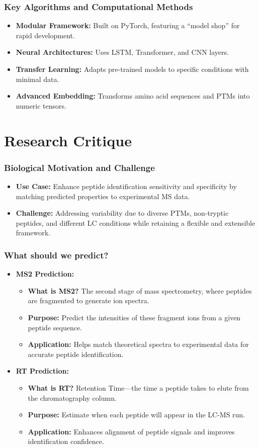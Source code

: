 \documentclass{beamer}
\begin{document}
\begin{frame}
  \frametitle{Key Algorithms and Computational Methods}
  \begin{itemize}
    \item \textbf{Modular Framework:} Built on PyTorch, featuring a “model shop” for rapid development.
    \item \textbf{Neural Architectures:} Uses LSTM, Transformer, and CNN layers.
    \item \textbf{Transfer Learning:} Adapts pre-trained models to specific conditions with minimal data.
    \item \textbf{Advanced Embedding:} Transforms amino acid sequences and PTMs into numeric tensors.
  \end{itemize}
\end{frame}

\section{Research Critique}
\begin{frame}
  \frametitle{Biological Motivation and Challenge}
  \begin{itemize}
    \item \textbf{Use Case:} Enhance peptide identification sensitivity and specificity by matching predicted properties to experimental MS data.
    \item \textbf{Challenge:} Addressing variability due to diverse PTMs, non-tryptic peptides, and different LC conditions while retaining a flexible and extensible framework.
  \end{itemize}
\end{frame}

\begin{frame}
  \frametitle{What should we predict? }
  \begin{itemize}
    \item \textbf{MS2 Prediction:}
      \begin{itemize}
        \item \textbf{What is MS2?} The second stage of mass spectrometry, where peptides are fragmented to generate ion spectra.
        \item \textbf{Purpose:} Predict the intensities of these fragment ions from a given peptide sequence.
        \item \textbf{Application:} Helps match theoretical spectra to experimental data for accurate peptide identification.
      \end{itemize}
    \item \textbf{RT Prediction:}
      \begin{itemize}
        \item \textbf{What is RT?} Retention Time—the time a peptide takes to elute from the chromatography column.
        \item \textbf{Purpose:} Estimate when each peptide will appear in the LC-MS run.
        \item \textbf{Application:} Enhances alignment of peptide signals and improves identification confidence.
      \end{itemize}
  \end{itemize}
\end{frame}
\end{document}
